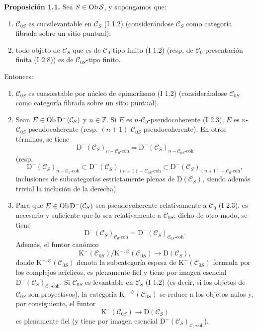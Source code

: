 \textbf{Proposición 1.1.} Sea $S\in\Ob \sisi{S}{\mathcal S}$, y supongamos que:
\begin{enumerate}[label=(\roman*)]
\item $\mathcal C_{0S}$ es cuasilevantable en $\mathcal C_S$ (I 1.2) (considerándose $\mathcal C_S$ como categoría fibrada sobre un sitio puntual);
\item todo objeto de $\mathcal C_S$ que es de $\mathcal C_0$-tipo finito (I 1.2) (resp. de $\mathcal C_0$-presentación finita (I 2.8)) es de $\mathcal C_{0S}$-tipo finito.
\end{enumerate}
Entonces:
\begin{enumerate}[label=\alph*)]
\item $\mathcal C_{0S}$ es cuasiestable por núcleo de epimorfismo (I 1.2) (considerándose $\mathcal C_{0S}$ como categoría fibrada sobre un sitio puntual).
\item Sean $E\in\Ob \mathrm D^{-}(\mathcal C_S)$ y $n\in\mathbb Z$. Si $E$ es $n$-$\mathcal C_0$-pseudocoherente (I 2.3), $E$ es $n$-$\mathcal C_{0S}$-pseudocoherente (resp. $(n+1)$-$\mathcal C_{0S}$-pseudocoherente). En otros términos, se tiene
\[
\mathrm D^{-}(\mathcal C_S)_{n-\mathcal C_0\text{-coh}}
=
\mathrm D^{-}(\mathcal C_S)_{n-\mathcal C_{0S}\text{-coh}}
\]
(resp.
\[
\mathrm D^{-}(\mathcal C_S)_{n-\mathcal C_0\text{-coh}}
\subset
\mathrm D^{-}(\mathcal C_S)_{(n+1)-\mathcal C_{0S}\text{-coh}}
\subset
\mathrm D^{-}(\mathcal C_S)_{(n+1)-\mathcal C_0\text{-coh}},
\]
inclusiones de subcategorías estrictamente plenas de $\mathrm D(\mathcal C_S)$, siendo además trivial la inclusión de la derecha).
\item Para que $E\in\Ob\mathrm D^{-}(\mathcal C_S)$ sea pseudocoherente relativamente a $\mathcal C_0$ (I 2.3), es necesario y suficiente que lo sea relativamente a $\mathcal C_{0S}$; dicho de otro modo, se tiene
\[
\mathrm D^{-}(\mathcal C_S)_{\mathcal C_0\text{-coh}}
=
\mathrm D^{-}(\mathcal C_S)_{\mathcal C_{0S}\text{-coh}}.
\]
Además, el funtor canónico
\[
\mathrm K^{-}(\mathcal C_{0S})/\mathrm K^{-,\varnothing}(\mathcal C_{0S})
\longrightarrow \mathrm D(\mathcal C_S),
\]
donde $\mathrm K^{-,\varnothing}(\mathcal C_{0S})$ denota la subcategoría espesa de $\mathrm K^{-}(\mathcal C_{0S})$ formada por los complejos acíclicos, es plenamente fiel y tiene por imagen esencial $\mathrm D^{-}(\mathcal C_S)_{\mathcal C_0\text{-coh}}$. Si $\mathcal C_{0S}$ es levantable en $\mathcal C_S$ (I 1.2) (es decir, si los objetos de $\mathcal C_{0S}$ son proyectivos), la categoría $\mathrm K^{-,\varnothing}(\mathcal C_{0S})$ se reduce a los objetos nulos y, por consiguiente, el funtor
\[
\mathrm K^{-}(\mathcal C_{0S})\longrightarrow \mathrm D(\mathcal C_S)
\]
es plenamente fiel (y tiene por imagen esencial $\mathrm D^{-}(\mathcal C_S)_{\mathcal C_0\text{-coh}}$).
\end{enumerate}

